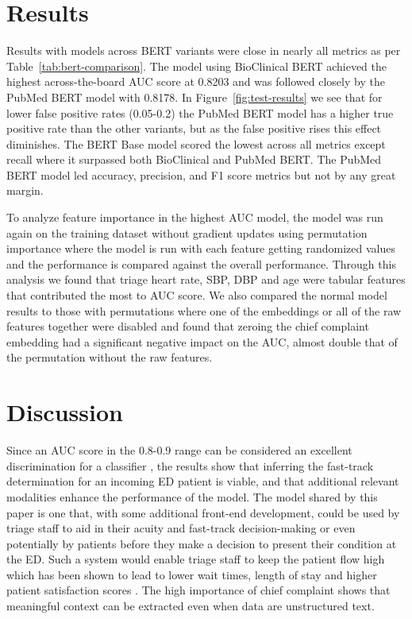 \documentclass[sigconf]{acmart}
\begin{document}
\section{Results}
Results with models across BERT variants were close in nearly all metrics as per Table~\ref{tab:bert-comparison}. The model using BioClinical BERT achieved the highest across-the-board AUC score at 0.8203 and was followed closely by the PubMed BERT model with 0.8178. In Figure~\ref{fig:test-results} we see that for lower false positive rates (0.05-0.2) the PubMed BERT model has a higher true positive rate than the other variants, but as the false positive rises this effect diminishes. The BERT Base model scored the lowest across all metrics except recall where it surpassed both BioClinical and PubMed BERT. The PubMed BERT model led accuracy, precision, and F1 score metrics but not by any great margin.

To analyze feature importance in the highest AUC model, the model was run again on the training dataset without gradient updates using permutation importance where the model is run with each feature getting randomized values and the performance is compared against the overall performance. Through this analysis we found that triage heart rate, SBP, DBP and age were tabular features that contributed the most to AUC score. We also compared the normal model results to those with permutations where one of the embeddings or all of the raw features together were disabled and found that zeroing the chief complaint embedding had a significant negative impact on the AUC, almost double that of the permutation without the raw features.



\section{Discussion}
Since an AUC score in the 0.8-0.9 range can be considered an excellent discrimination for a classifier \cite{hosmer2013applied}, the results show that inferring the fast-track determination for an incoming ED patient is viable, and that additional relevant modalities enhance the performance of the model. The model shared by this paper is one that, with some additional front-end development, could be used by triage staff to aid in their acuity and fast-track decision-making or even potentially by patients before they make a decision to present their condition at the ED. Such a system would enable triage staff to keep the patient flow high which has been shown to lead to lower wait times, length of stay and higher patient satisfaction scores \cite{Chrusciele026200,Quattrini2011,Nash2007,Hwang2015}. The high importance of chief complaint shows that meaningful context can be extracted even when data are unstructured text.
\end{document}
